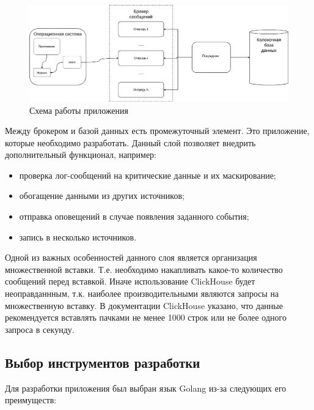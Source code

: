 \documentclass[14pt, russian]{scrartcl}
\begin{document}
\begin{figure}[H]
	\centering
	\begin{minipage}[t]{.9\textwidth}
		\centering
		\includegraphics[width=.7\textwidth]{./imgs/appscheme.png}
	\end{minipage}
	\caption{Схема работы приложения}
	\label{fig:appscheme}
\end{figure}


Между брокером и базой данных есть промежуточный элемент. Это приложение,
которые необходимо разработать. Данный слой позволяет
внедрить дополнительный функционал, например:

\begin{itemize}
	\item проверка лог-сообщений на критические данные и их маскирование;
	\item обогащение данными из других источников;
	\item отправка оповещений в случае появления заданного события;
	\item запись в несколько источников.
\end{itemize}

Одной из важных особенностей данного слоя является организация
множественной вставки. Т.е. необходимо накапливать
какое-то количество сообщений перед вставкой.
Иначе использование ClickHouse будет неоправданнным, т.к.
наиболее производительными являются запросы на множественную
вставку. В документации ClickHouse \cite{ClickDocs} указано, что данные
рекомендуется вставлять пачками не менее 1000 строк
или не более одного запроса в секунду.

\subsection{Выбор инструментов разработки}

Для разработки приложения был выбран язык Golang \cite{Golang} из-за следующих его преимуществ:
\end{document}
